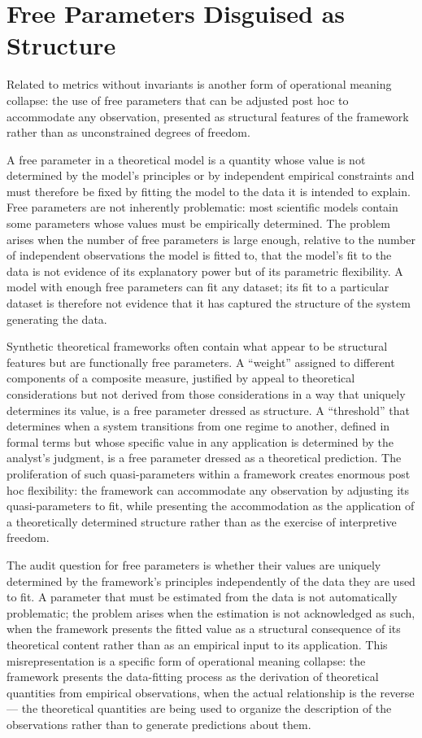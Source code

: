 \documentclass[12pt, openright, twoside]{book}
\begin{document}
\section{Free Parameters Disguised as Structure}

Related to metrics without invariants is another form
of operational meaning collapse: the use of free parameters
that can be adjusted post hoc to accommodate any
observation, presented as structural features of the
framework rather than as unconstrained degrees of freedom.

A free parameter in a theoretical model is a quantity
whose value is not determined by the model's principles
or by independent empirical constraints and must therefore
be fixed by fitting the model to the data it is intended
to explain. Free parameters are not inherently problematic:
most scientific models contain some parameters whose values
must be empirically determined. The problem arises when
the number of free parameters is large enough, relative
to the number of independent observations the model is
fitted to, that the model's fit to the data is not evidence
of its explanatory power but of its parametric flexibility.
A model with enough free parameters can fit any dataset;
its fit to a particular dataset is therefore not evidence
that it has captured the structure of the system generating
the data.

Synthetic theoretical frameworks often contain what appear
to be structural features but are functionally free parameters.
A ``weight'' assigned to different components of a composite
measure, justified by appeal to theoretical considerations
but not derived from those considerations in a way that
uniquely determines its value, is a free parameter dressed
as structure. A ``threshold'' that determines when a system
transitions from one regime to another, defined in formal
terms but whose specific value in any application is
determined by the analyst's judgment, is a free parameter
dressed as a theoretical prediction. The proliferation of
such quasi-parameters within a framework creates enormous
post hoc flexibility: the framework can accommodate any
observation by adjusting its quasi-parameters to fit,
while presenting the accommodation as the application
of a theoretically determined structure rather than
as the exercise of interpretive freedom.

The audit question for free parameters is whether their
values are uniquely determined by the framework's principles
independently of the data they are used to fit. A parameter
that must be estimated from the data is not automatically
problematic; the problem arises when the estimation is
not acknowledged as such, when the framework presents
the fitted value as a structural consequence of its
theoretical content rather than as an empirical input
to its application. This misrepresentation is a specific
form of operational meaning collapse: the framework presents
the data-fitting process as the derivation of theoretical
quantities from empirical observations, when the actual
relationship is the reverse --- the theoretical quantities
are being used to organize the description of the observations
rather than to generate predictions about them.
\end{document}
